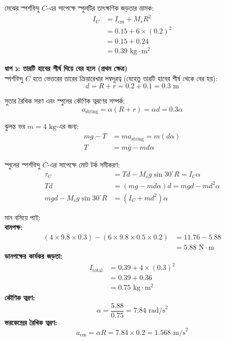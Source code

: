 \documentclass[12pt, a4paper]{article}
\begin{document}
\vspace{1em}

\begin{tcolorbox}[solutionbox={সমাধান (Solution)}]
    \noindent
    মেঝের স্পর্শবিন্দু $C$-এর সাপেক্ষে স্পুলটির তাৎক্ষণিক জড়তার ভ্রামক:
    \begin{align*}
        I_C &= I_{\text{cm}} + M_s R^2 \\
        &= 0.15 + 6 \times (0.2)^2 \\
        &= 0.15 + 0.24 \\
        &= 0.39\text{ kg}\cdot\text{m}^2
    \end{align*}
    
    \vspace{0.3em}
    \noindent\textbf{ধাপ ১: তারটি হাবের শীর্ষ দিয়ে বের হলে (প্রথম ক্ষেত্র)} \\
    স্পর্শবিন্দু $C$ হতে ভেতরের তারের ক্রিয়ারেখার লম্বদূরত্ব (যেহেতু তারটি হাবের শীর্ষ থেকে বের হয়):
    \[ d = R + r = 0.2 + 0.1 = 0.3\text{ m} \]
    
    সুতার রৈখিক সরণ এবং স্পুলের কৌণিক ত্বরণের সম্পর্ক:
    \[ a_{\text{string}} = \alpha (R + r) = \alpha d = 0.3 \alpha \]
    
    ঝুলন্ত ভর $m = 4\text{ kg}$-এর জন্য:
    \begin{align*}
        m g - T &= m a_{\text{string}} = m (d \alpha) \\
        T &= m g - m d \alpha
    \end{align*}
    
    স্পুলের স্পর্শবিন্দু $C$-এর সাপেক্ষে মোট টর্ক সমীকরণ:
    \begin{align*}
        \tau_C &= T d - M_s g \sin 30^\circ R = I_C \alpha \\
        T d &= (m g - m d \alpha) d = m g d - m d^2 \alpha \\
        m g d - M_s g \sin 30^\circ R &= (I_C + m d^2) \alpha
    \end{align*}
    
    মান বসিয়ে পাই: \\
    \textbf{বামপক্ষ:}
    \begin{align*}
        (4 \times 9.8 \times 0.3) - (6 \times 9.8 \times 0.5 \times 0.2) &= 11.76 - 5.88 \\
        &= 5.88\text{ N}\cdot\text{m}
    \end{align*}
    \textbf{ডানপক্ষের কার্যকর জড়তা:}
    \begin{align*}
        I_{\text{total}} &= 0.39 + 4 \times (0.3)^2 \\
        &= 0.39 + 0.36 \\
        &= 0.75\text{ kg}\cdot\text{m}^2
    \end{align*}
    \textbf{কৌণিক ত্বরণ:}
    \[ \alpha = \frac{5.88}{0.75} = 7.84\text{ rad/s}^2 \]
    \textbf{ভরকেন্দ্রের রৈখিক ত্বরণ:}
    \[ a_{\text{cm}} = \alpha R = 7.84 \times 0.2 = 1.568\text{ m/s}^2 \]
    

\end{tcolorbox}
\end{document}
